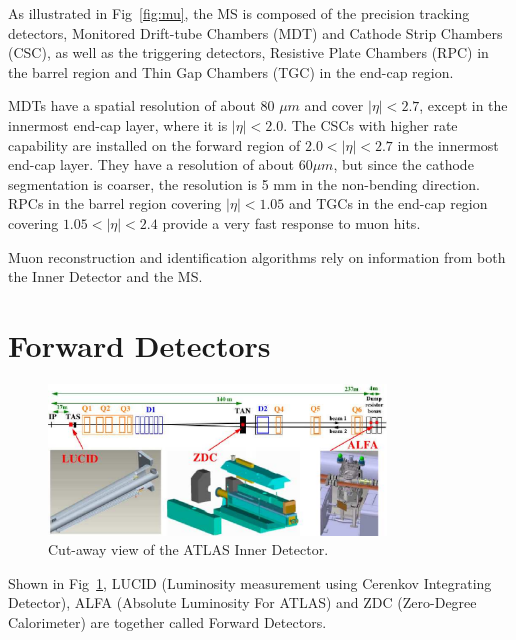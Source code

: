 \par As illustrated in Fig~\ref{fig:mu}, the MS is composed of the precision tracking detectors, Monitored Drift-tube Chambers (MDT) and Cathode Strip Chambers (CSC), as well as the triggering detectors, Resistive Plate Chambers (RPC) in the barrel region and Thin Gap Chambers (TGC) in the end-cap region.

\par MDTs have a spatial resolution of about 80 $\mu m$ and cover $|\eta| < 2.7$, except in the innermost end-cap layer, where it is $|\eta| < 2.0$. The CSCs with higher rate capability are installed on the forward region of $2.0 < |\eta| < 2.7$ in the innermost end-cap layer. They have a resolution of about 60$\mu m$, but since the cathode segmentation is coarser, the resolution is 5 mm in the non-bending direction. RPCs in the barrel region covering $|\eta| < 1.05$ and TGCs in the end-cap region covering $1.05 < |\eta| < 2.4$ provide a very fast response to muon hits.

\par Muon reconstruction and identification algorithms rely on information from both the Inner Detector and the MS.

\section{Forward Detectors}
\label{sec:for}
\begin{figure}[htbp]
 \begin{center}
 \includegraphics[width=0.8\textwidth]{chapters/c4/figures/forward}
 \end{center}
 \caption{Cut-away view of the ATLAS Inner Detector.}
 \label{fig:forward}
\end{figure}

\par Shown in Fig~\ref{fig:forward}, LUCID (Luminosity measurement using Cerenkov Integrating Detector), ALFA (Absolute Luminosity For ATLAS) and ZDC (Zero-Degree Calorimeter) are together called Forward Detectors. 

